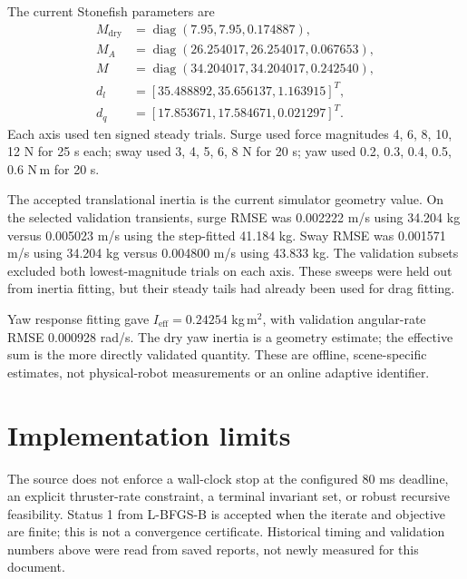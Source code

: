 \documentclass[11pt,a4paper]{article}
\newcommand{\diag}{\operatorname{diag}}
\begin{document}
The current Stonefish parameters are
\begin{align*}
M_{\mathrm{dry}}&=\diag(7.95,7.95,0.174887),\\
M_A&=\diag(26.254017,26.254017,0.067653),\\
M&=\diag(34.204017,34.204017,0.242540),\\
d_l&=[35.488892,35.656137,1.163915]^T,\\
d_q&=[17.853671,17.584671,0.021297]^T.
\end{align*}
Each axis used ten signed steady trials. Surge used force magnitudes
4, 6, 8, 10, 12 N for 25 s each; sway used 3, 4, 5, 6, 8 N for 20 s;
yaw used 0.2, 0.3, 0.4, 0.5, 0.6 N\,m for 20 s.

The accepted translational inertia is the current simulator geometry value.
On the selected validation transients, surge RMSE was 0.002222 m/s using
34.204 kg versus 0.005023 m/s using the step-fitted 41.184 kg. Sway RMSE was
0.001571 m/s using 34.204 kg versus 0.004800 m/s using 43.833 kg.
The validation subsets excluded both lowest-magnitude trials on each axis.
These sweeps were held out from inertia fitting, but their steady tails had
already been used for drag fitting.

Yaw response fitting gave $I_{\mathrm{eff}}=0.24254$ kg\,m$^2$, with
validation angular-rate RMSE 0.000928 rad/s. The dry yaw inertia is a geometry
estimate; the effective sum is the more directly validated quantity. These
are offline, scene-specific estimates, not physical-robot measurements or an
online adaptive identifier.

\section{Implementation limits}
The source does not enforce a wall-clock stop at the configured 80 ms
deadline, an explicit thruster-rate constraint, a terminal invariant set, or
robust recursive feasibility. Status 1 from L-BFGS-B is accepted when the
iterate and objective are finite; this is not a convergence certificate.
Historical timing and validation numbers above were read from saved reports,
not newly measured for this document.
\end{document}
